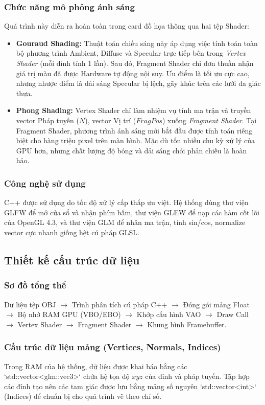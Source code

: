 \documentclass[13pt, a4paper]{extarticle}
\begin{document}
\subsubsection{Chức năng mô phỏng ánh sáng}
Quá trình này diễn ra hoàn toàn trong card đồ họa thông qua hai tệp Shader:
\begin{itemize}
    \item \textbf{Gouraud Shading:} Thuật toán chiếu sáng này áp dụng việc tính toán toàn bộ phương trình Ambient, Diffuse và Specular trực tiếp bên trong \textit{Vertex Shader} (mỗi đỉnh tính 1 lần). Sau đó, Fragment Shader chỉ đơn thuần nhận giá trị màu đã được Hardware tự động nội suy. Ưu điểm là tối ưu cực cao, nhưng nhược điểm là dải sáng Specular bị lệch, gãy khúc trên các lưới đa giác thưa.
    \item \textbf{Phong Shading:} Vertex Shader chỉ làm nhiệm vụ tính ma trận và truyền vector Pháp tuyến ($N$), vector Vị trí ($FragPos$) xuống \textit{Fragment Shader}. Tại Fragment Shader, phương trình ánh sáng mới bắt đầu được tính toán riêng biệt cho hàng triệu pixel trên màn hình. Mặc dù tốn nhiều chu kỳ xử lý của GPU hơn, nhưng chất lượng độ bóng và dải sáng chói phản chiếu là hoàn hảo.
\end{itemize}

\subsubsection{Công nghệ sử dụng}
C++ được sử dụng do tốc độ xử lý cấp thấp ưu việt. Hệ thống dùng thư viện GLFW để mở cửa sổ và nhận phím bấm, thư viện GLEW để nạp các hàm cốt lõi của OpenGL 4.3, và thư viện GLM để nhân ma trận, tính sin/cos, normalize vector cực nhanh giống hệt cú pháp GLSL.

\subsection{Thiết kế cấu trúc dữ liệu}
\subsubsection{Sơ đồ tổng thể}
Dữ liệu tệp OBJ $\rightarrow$ Trình phân tích cú pháp C++ $\rightarrow$ Đóng gói mảng Float $\rightarrow$ Bộ nhớ RAM GPU (VBO/EBO) $\rightarrow$ Khớp cấu hình VAO $\rightarrow$ Draw Call $\rightarrow$ Vertex Shader $\rightarrow$ Fragment Shader $\rightarrow$ Khung hình Framebuffer.

\subsubsection{Cấu trúc dữ liệu mảng (Vertices, Normals, Indices)}
Trong RAM của hệ thống, dữ liệu được khai báo bằng các `std::vector<glm::vec3>` chứa hệ tọa độ $xyz$ của đỉnh và pháp tuyến. Tập hợp các đỉnh tạo nên các tam giác được lưu bằng mảng số nguyên `std::vector<int>` (Indices) để chuẩn bị cho quá trình vẽ theo chỉ số.
\end{document}
